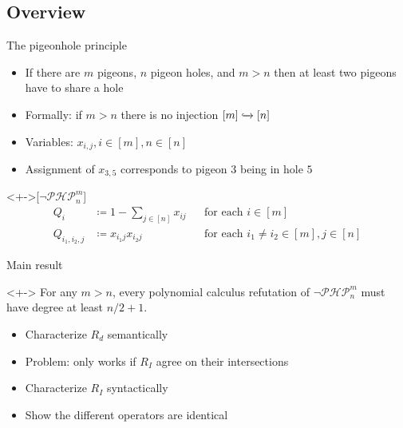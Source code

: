 \documentclass[xcolor={dvipsnames}, aspectratio=169, handout]{beamer}
\newcommand{\PHP}{\ensuremath{\neg \mathcal{PHP}^m_n}\xspace}
\newcommand{\Qiij}{Q_{i_1, i_2, j}}
\begin{document}
\subsection{Overview}
\begin{frame}{The pigeonhole principle}
    \begin{itemize}[<+->]
        \item If there are $m$ pigeons, $n$ pigeon holes, and $m > n$ then at least two pigeons have to share a hole
        \item Formally: if $m > n$ there is no injection $[m] \xhookrightarrow{} [n]$
        \item Variables: $x_{i, j}, i \in [m], n \in [n]$
        \item Assignment of $x_{3, 5}$ corresponds to pigeon $3$ being in hole $5$
    \end{itemize}
    \begin{definition}<+->[\PHP]
        \begin{align*}
            Q_i &\coloneqq 1 - \sum_{j \in [n]} x_{ij} &&\text{for each $i \in [m]$}\\
            \Qiij &\coloneqq x_{i_1j} x_{i_2j} &&\text{for each $i_1 \neq i_2 \in [m], j \in [n]$}
        \end{align*}
    \end{definition}
\end{frame}

\begin{frame}{Main result}
    \begin{theorem}<+->
        For any $m > n$, every polynomial calculus refutation of \PHP must have degree at least $n/2 + 1$.
    \end{theorem}
    \begin{itemize}[<+->]
        \item Characterize $R_d$ semantically
        \item Problem: only works if $R_I$ agree on their intersections
        \item Characterize $R_I$ syntactically
        \item Show the different operators are identical
    \end{itemize}
\end{frame}
\end{document}
